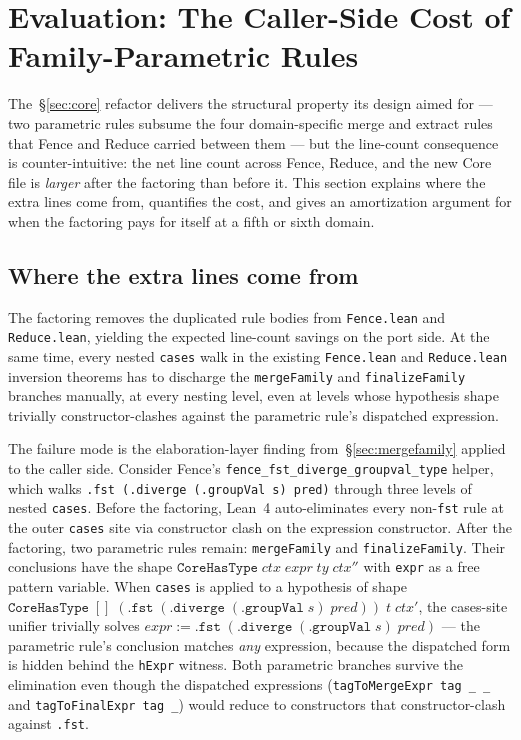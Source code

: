 \documentclass[acmsmall,screen,review,anonymous,nonacm]{acmart}
\newcommand{\CoreHasType}{\texttt{CoreHasType}}
\begin{document}

\section{Evaluation: The Caller-Side Cost of Family-Parametric Rules}\label{sec:evaluation}

The~\S\ref{sec:core} refactor delivers the structural property its design aimed for --- two parametric rules subsume the four domain-specific merge and extract rules that Fence and Reduce carried between them --- but the line-count consequence is counter-intuitive: the net line count across Fence, Reduce, and the new Core file is \emph{larger} after the factoring than before it. This section explains where the extra lines come from, quantifies the cost, and gives an amortization argument for when the factoring pays for itself at a fifth or sixth domain.

\subsection{Where the extra lines come from}\label{sec:extra-lines}

The factoring removes the duplicated rule bodies from \texttt{Fence.lean} and \texttt{Reduce.lean}, yielding the expected line-count savings on the port side. At the same time, every nested \texttt{cases} walk in the existing \texttt{Fence.lean} and \texttt{Reduce.lean} inversion theorems has to discharge the \texttt{mergeFamily} and \texttt{finalizeFamily} branches manually, at every nesting level, even at levels whose hypothesis shape trivially constructor-clashes against the parametric rule's dispatched expression.

The failure mode is the elaboration-layer finding from~\S\ref{sec:mergefamily} applied to the caller side. Consider Fence's \texttt{fence\_fst\_diverge\_groupval\_type} helper, which walks \texttt{.fst (.diverge (.groupVal s) pred)} through three levels of nested \texttt{cases}. Before the factoring, Lean~4 auto-eliminates every non-\texttt{fst} rule at the outer \texttt{cases} site via constructor clash on the expression constructor. After the factoring, two parametric rules remain: \texttt{mergeFamily} and \texttt{finalizeFamily}. Their conclusions have the shape $\CoreHasType\;\mathit{ctx}\;\mathit{expr}\;\mathit{ty}\;\mathit{ctx''}$ with \texttt{expr} as a free pattern variable. When \texttt{cases} is applied to a hypothesis of shape $\CoreHasType\;[]\;(\texttt{.fst}\;(\texttt{.diverge}\;(\texttt{.groupVal}\;s)\;\mathit{pred}))\;t\;\mathit{ctx'}$, the cases-site unifier trivially solves $\mathit{expr} := \texttt{.fst}\;(\texttt{.diverge}\;(\texttt{.groupVal}\;s)\;\mathit{pred})$ --- the parametric rule's conclusion matches \emph{any} expression, because the dispatched form is hidden behind the \texttt{hExpr} witness. Both parametric branches survive the elimination even though the dispatched expressions (\texttt{tagToMergeExpr tag \_ \_} and \texttt{tagToFinalExpr tag \_}) would reduce to constructors that constructor-clash against \texttt{.fst}.
\end{document}
